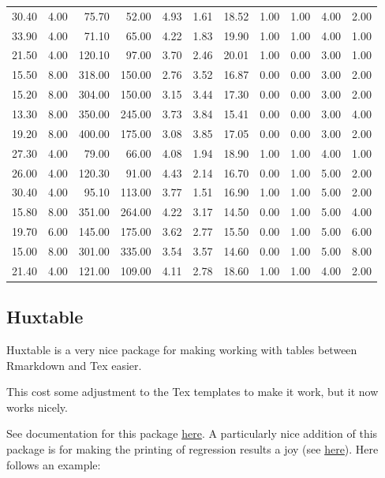\documentclass[12pt,preprint, authoryear]{elsarticle}
\numberwithin{equation}{section}
\numberwithin{figure}{section}
\numberwithin{table}{section}
\begin{document}
\begin{longtable}{rrrrrrrrrrr}
  30.40 & 4.00 & 75.70 & 52.00 & 4.93 & 1.61 & 18.52 & 1.00 & 1.00 & 4.00 & 2.00 \\ 
  33.90 & 4.00 & 71.10 & 65.00 & 4.22 & 1.83 & 19.90 & 1.00 & 1.00 & 4.00 & 1.00 \\ 
  21.50 & 4.00 & 120.10 & 97.00 & 3.70 & 2.46 & 20.01 & 1.00 & 0.00 & 3.00 & 1.00 \\ 
  15.50 & 8.00 & 318.00 & 150.00 & 2.76 & 3.52 & 16.87 & 0.00 & 0.00 & 3.00 & 2.00 \\ 
  15.20 & 8.00 & 304.00 & 150.00 & 3.15 & 3.44 & 17.30 & 0.00 & 0.00 & 3.00 & 2.00 \\ 
  13.30 & 8.00 & 350.00 & 245.00 & 3.73 & 3.84 & 15.41 & 0.00 & 0.00 & 3.00 & 4.00 \\ 
  19.20 & 8.00 & 400.00 & 175.00 & 3.08 & 3.85 & 17.05 & 0.00 & 0.00 & 3.00 & 2.00 \\ 
  27.30 & 4.00 & 79.00 & 66.00 & 4.08 & 1.94 & 18.90 & 1.00 & 1.00 & 4.00 & 1.00 \\ 
  26.00 & 4.00 & 120.30 & 91.00 & 4.43 & 2.14 & 16.70 & 0.00 & 1.00 & 5.00 & 2.00 \\ 
  30.40 & 4.00 & 95.10 & 113.00 & 3.77 & 1.51 & 16.90 & 1.00 & 1.00 & 5.00 & 2.00 \\ 
  15.80 & 8.00 & 351.00 & 264.00 & 4.22 & 3.17 & 14.50 & 0.00 & 1.00 & 5.00 & 4.00 \\ 
  19.70 & 6.00 & 145.00 & 175.00 & 3.62 & 2.77 & 15.50 & 0.00 & 1.00 & 5.00 & 6.00 \\ 
  15.00 & 8.00 & 301.00 & 335.00 & 3.54 & 3.57 & 14.60 & 0.00 & 1.00 & 5.00 & 8.00 \\ 
  21.40 & 4.00 & 121.00 & 109.00 & 4.11 & 2.78 & 18.60 & 1.00 & 1.00 & 4.00 & 2.00 \\ 
   \bottomrule
\end{longtable}
\endgroup

\hfill

\hypertarget{huxtable}{%
\subsection{Huxtable}\label{huxtable}}

Huxtable is a very nice package for making working with tables between
Rmarkdown and Tex easier.

This cost some adjustment to the Tex templates to make it work, but it
now works nicely.

See documentation for this package
\href{https://hughjonesd.github.io/huxtable/huxtable.html}{here}. A
particularly nice addition of this package is for making the printing of
regression results a joy (see
\href{https://hughjonesd.github.io/huxtable/huxtable.html\#creating-a-regression-table}{here}).
Here follows an example:
\end{document}
